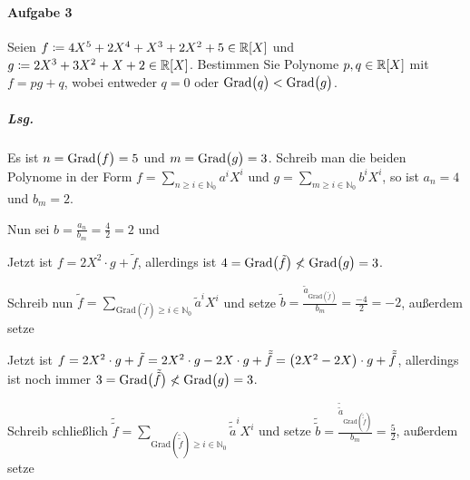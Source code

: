 \documentclass{scrreprt}
\newcommand\Grad{\text{Grad}}
\begin{document}
\paragraph{Aufgabe 3} Seien
$f \coloneqq 4X^5 + 2X^4 + X^3 + 2X^2 + 5 \in \mathbb{R}\qty[X]$ und
$g \coloneqq 2X^3 + 3X^2 + X + 2 \in \mathbb{R}\qty[X]$.
Bestimmen Sie Polynome $p, q \in \mathbb{R}\qty[X]$ mit
$f = pg + q$, wobei entweder $q = 0$ oder $\Grad\qty\big(q) < \Grad\qty\big(g)$.

\subparagraph{Lsg.} Es ist $n = \Grad\qty\big(f) = 5$ und
$m = \Grad\qty\big(g) = 3$.
Schreib man die beiden Polynome in der Form
$f = \sum_{n \geq i \in \mathbb{N}_0} a^iX^i$ und
$g = \sum_{m \geq i \in \mathbb{N}_0} b^iX^i$,
so ist $a_n = 4$ und $b_m = 2$.

Nun sei $b = \frac{a_n}{b_m} = \frac{4}{2} = 2$ und

Jetzt ist $f = 2X^2 \cdot g + \tilde f$, allerdings ist
$4 = \Grad\qty\big(\tilde f) \nless \Grad\qty\big(g) = 3$.

Schreib nun
$\tilde f = \sum_{\Grad(\tilde f) \geq i \in \mathbb{N}_0} {\tilde a}^iX^i$
und setze ${\tilde b} = \frac{{\tilde a}_{\Grad(\tilde f)}}{b_m}
= \frac{-4}{2} = -2$, außerdem setze

Jetzt ist $f = 2X^2 \cdot g + \tilde f
= 2X^2 \cdot g - 2X \cdot g + {\tilde{\tilde f}}
= \qty(2X^2 - 2X) \cdot g + {\tilde{\tilde f}}$, allerdings ist noch immer
$3 = \Grad\qty\big(\tilde{\tilde f}) \nless \Grad\qty\big(g) = 3$.

Schreib schließlich
$\tilde {\tilde f} = \sum_{\Grad(\tilde {\tilde f}) \geq i \in \mathbb{N}_0} \tilde {\tilde a}^iX^i$
und setze $\tilde {\tilde b} = \frac{\tilde {\tilde a}_{\Grad(\tilde {\tilde f})}}{b_m}
= \frac{5}{2}$, außerdem setze
\end{document}
